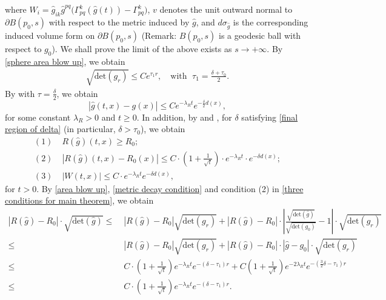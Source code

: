 \documentclass[12pt]{amsart}
\begin{document}
where $W_i = \hat{g}_{ik} \hat{g}^{pq}\bigl(\Gamma_{pq}^k(\hat{g}(t)) - \Gamma_{pq}^k\bigr)$, $v$ denotes the unit outward normal to $\partial B(p_0, s)$ with respect to the metric induced by $\hat{g}$, and $d\sigma_{\hat{g}}$ is the corresponding induced volume form on $\partial B(p_0, s)$ (Remark: $B(p_0, s)$ is a geodesic ball with respect to $g_0$). We shall prove the limit of the above exists as $s \rightarrow +\infty$. By \eqref{sphere area blow up}, we obtain 
\begin{align}\label{area blow up}
    \sqrt{\mathrm{det}(g_r)} \leq C e^{\tau_1 r}, \quad\text{with }\; \tau_1 = \frac{\delta + \tau_0}{2}. 
\end{align}
By  with $\tau = \frac{\delta}{2}$, we obtain 
\begin{equation}\label{metric decay condition}
    |\hat{g}(t, x) - g(x)| \leq Ce^{-\lambda_R t}e^{-\frac{\delta}{2}d(x)},
\end{equation}
for some constant $\lambda_R > 0$ and $t \geq  0$. In addition, by  and , for $\delta$ satisfying \eqref{final region of delta} (in particular, $\delta > \tau_0$), we obtain
\begin{equation}\label{three conditions for main theorem}
    \begin{split}
        (1)&\; R(\hat{g})(t, x) \geq R_0;\\
        (2)&\; |R(\hat{g})(t, x) - R_0(x)| \leq C\cdot (1 + \frac{1}{\sqrt{t}}) \cdot e^{-\lambda_R t} \cdot e^{-\delta d(x)};\\
        (3)&\; |W(t, x)| \leq C\cdot e^{-\lambda_R t} e^{-\delta d(x)},
    \end{split}
\end{equation}
for $t > 0$. By \eqref{area blow up}, \eqref{metric decay condition} and condition (2) in \eqref{three conditions for main theorem}, we obtain 
\begin{equation}\label{curvature decay precursor}
    \begin{split}
        |R(\hat{g}) - R_0|\cdot \sqrt{\mathrm{det}(\hat{g})} \leq&\; |R(\hat{g}) - R_0|\sqrt{\mathrm{det}(g_r)} + |R(\hat{g}) - R_0|\cdot |\frac{\sqrt{\mathrm{det}(\hat{g})}}{\sqrt{\mathrm{det}(g_0)}} - 1|\cdot \sqrt{\mathrm{det}(g_r)}\\
        \leq&\; |R(\hat{g}) - R_0|\sqrt{\mathrm{det}(g_r)} + |R(\hat{g}) - R_0|\cdot |\hat{g} - g_0|\cdot \sqrt{\mathrm{det}(g_r)}\\
        \leq&\; C\cdot (1 + \frac{1}{\sqrt{t}}) e^{-\lambda_R t} e^{-(\delta - \tau_1)r} + C(1 + \frac{1}{\sqrt{t}}) e^{-2\lambda_R t} e^{-(\frac{3}{2}\delta - \tau_1)r} \\
        \leq&\; C\cdot (1 + \frac{1}{\sqrt{t}}) e^{-\lambda_R t} e^{-(\delta - \tau_1)r}. 
    \end{split}
\end{equation}
\end{document}

